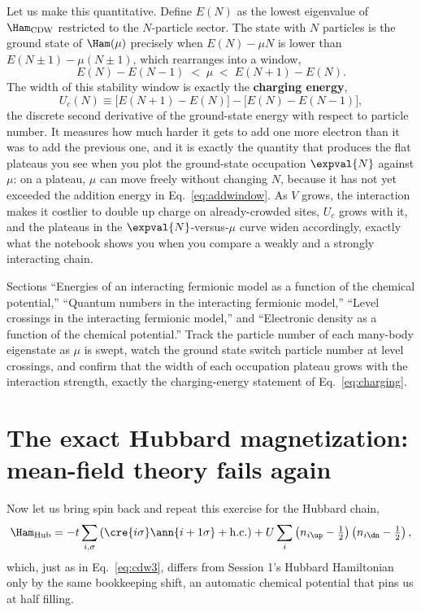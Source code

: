 \documentclass[all_sessions.tex]{subfiles}
\begin{document}
Let us make this quantitative. Define $E(N)$ as the lowest eigenvalue of $\Ham_{\mathrm{CDW}}$
restricted to the $N$-particle sector. The state with $N$ particles is the ground state of
$\Ham(\mu)$ precisely when $E(N) - \mu N$ is lower than $E(N\pm1) - \mu(N\pm1)$, which rearranges
into a window,
\begin{equation}
  E(N) - E(N-1) \;<\; \mu \;<\; E(N+1) - E(N).
  \label{eq:addwindow}
\end{equation}
The width of this stability window is exactly the \textbf{charging energy},
\begin{equation}
  U_c(N) \equiv \big[E(N+1) - E(N)\big] - \big[E(N) - E(N-1)\big],
  \label{eq:charging}
\end{equation}
the discrete second derivative of the ground-state energy with respect to particle number. It
measures how much harder it gets to add one more electron than it was to add the previous one, and
it is exactly the quantity that produces the flat plateaus you see when you plot the ground-state
occupation $\expval{N}$ against $\mu$: on a plateau, $\mu$ can move freely without changing $N$,
because it has not yet exceeded the addition energy in Eq.~\eqref{eq:addwindow}. As $V$ grows, the
interaction makes it costlier to double up charge on already-crowded sites, $U_c$ grows with it,
and the plateaus in the $\expval{N}$-versus-$\mu$ curve widen accordingly, exactly what the
notebook shows you when you compare a weakly and a strongly interacting chain.

\begin{notebook}
Sections ``Energies of an interacting fermionic model as a function of the chemical potential,''
``Quantum numbers in the interacting fermionic model,'' ``Level crossings in the interacting
fermionic model,'' and ``Electronic density as a function of the chemical potential.'' Track the
particle number of each many-body eigenstate as $\mu$ is swept, watch the ground state switch
particle number at level crossings, and confirm that the width of each occupation plateau grows
with the interaction strength, exactly the charging-energy statement of
Eq.~\eqref{eq:charging}.
\end{notebook}

\section{The exact Hubbard magnetization: mean-field theory fails again}
\label{sec:hubbardmag}
Now let us bring spin back and repeat this exercise for the Hubbard chain,
\begin{equation}
  \Ham_{\mathrm{Hub}} = -t\sum_{i,\sigma}\left(\cre{i\sigma}\ann{i+1\sigma} + \mathrm{h.c.}\right)
    + U\sum_i \left(n_{i\up} - \tfrac12\right)\left(n_{i\dn} - \tfrac12\right),
  \label{eq:hub3}
\end{equation}
which, just as in Eq.~\eqref{eq:cdw3}, differs from Session 1's Hubbard Hamiltonian only by the
same bookkeeping shift, an automatic chemical potential that pins us at half filling.
\end{document}
